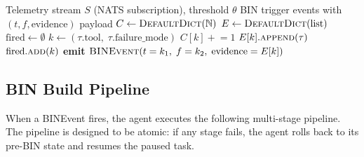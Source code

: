 \begin{algorithm}[H]
\caption{FRICTION-DETECT$(S, \theta)$}
\label{alg:friction_detect}
\begin{algorithmic}[1]
\Require Telemetry stream $S$ (NATS subscription), threshold $\theta$
\Ensure BIN trigger events with $(t, f, \text{evidence})$ payload
\State $C \gets \textsc{DefaultDict}(\mathbb{N})$ 
\State $E \gets \textsc{DefaultDict}(\text{list})$ 
\State $\text{fired} \gets \emptyset$ 
        \State $k \gets (\tau.\text{tool},\; \tau.\text{failure\_mode})$
        \State $C[k] \mathrel{+}= 1$
        \State $E[k].\textsc{append}(\tau)$
            \State $\text{fired}.\textsc{add}(k)$
            \State \textbf{emit} $\textsc{BINEvent}(t=k_1,\; f=k_2,\; \text{evidence}=E[k])$
        \EndIf
    \EndIf
\EndFor
\end{algorithmic}
\end{algorithm}

\subsection{BIN Build Pipeline}

When a BINEvent fires, the agent executes the following multi-stage pipeline.
The pipeline is designed to be atomic: if any stage fails, the agent rolls back
to its pre-BIN state and resumes the paused task.

